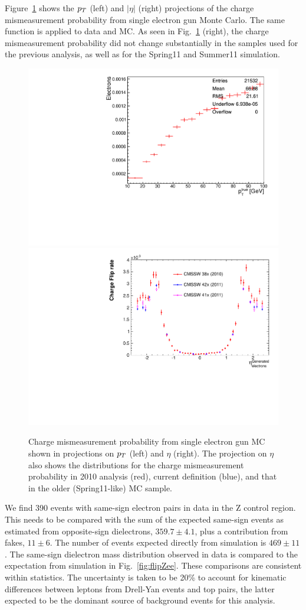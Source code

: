 Figure~\ref{fig:flipvsptOrEta} shows the $p_T$ (left) and $|\eta |$ (right) projections of 
the charge mismeasurement probability  from single electron gun Monte Carlo.
The same function is applied to data and MC.  
As seen in Fig.~\ref{fig:flipvsptOrEta} (right), the charge mismeasurement probability
did not change substantially in the samples used for the previous analysis, as well as for the Spring11 and Summer11
simulation.

\begin{figure}[h]
\begin{center}
\includegraphics[width=0.47\linewidth]{figs/flipRate2011VsPt}
\includegraphics[width=0.47\linewidth]{figs/flipRate2011PAS}
\caption{\label{fig:flipvsptOrEta}Charge mismeasurement probability from single electron gun MC
shown in projections on $p_T$ (left) and $\eta$ (right).
The projection on $\eta$ also shows the distributions for the charge mismeasurement probability
in 2010 analysis (red), current definition (blue), and that in the older (Spring11-like) MC sample.}
\end{center}
\end{figure}

We find 390 events with same-sign electron pairs in data in the Z control region.
This needs to be compared with the sum of the expected same-sign events as estimated from
opposite-sign dielectrons, $359.7\pm4.1$, plus a contribution from fakes, $11\pm 6$.
The number of events expected directly from simulation is  $469\pm 11$.
The same-sign dielectron mass distribution observed in data is compared to the expectation from
simulation in Fig.~\ref{fig:flipZee}.
These comparisons are consistent within statistics.
The uncertainty is taken to be 20\% to account for kinematic differences between leptons from Drell-Yan events and top pairs, the latter expected to be the dominant source of background events for this analysis.



